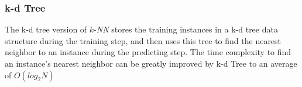 		\subsubsection{k-d Tree}
		The k-d tree version of $k$-\textit{NN} stores the training instances in a k-d tree data structure during the training step, and then uses this tree to find the nearest neighbor to an instance during the predicting step. The time complexity to find an instance's nearest neighbor can be greatly improved by k-d Tree to an average of $O(log_2N)$